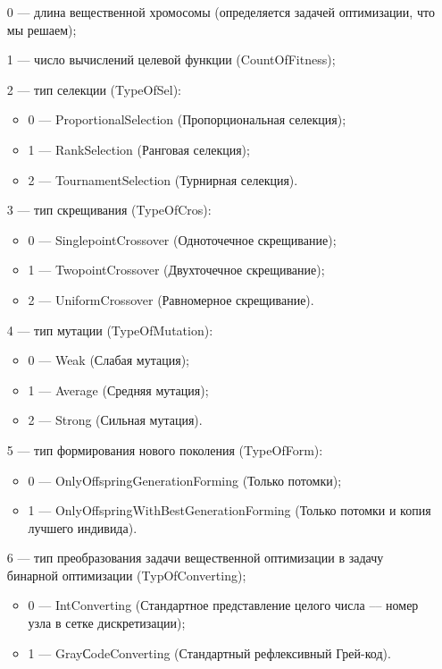  \begin{itemize}
 \item   [0] --- длина вещественной хромосомы (определяется задачей оптимизации, что мы решаем);
  \item   [1] --- число вычислений целевой функции (CountOfFitness);
  \item    [2] --- тип селекции (TypeOfSel):
 \begin{itemize}
       \item 0 --- ProportionalSelection (Пропорциональная селекция);
 
       \item 1 --- RankSelection (Ранговая селекция);
 
       \item 2 --- TournamentSelection (Турнирная селекция).
	    \end{itemize}
 
 \item [3] --- тип скрещивания (TypeOfCros):
  \begin{itemize}
       \item 0 --- SinglepointCrossover (Одноточечное скрещивание);
 
       \item 1 --- TwopointCrossover (Двухточечное скрещивание);
 
       \item 2 --- UniformCrossover (Равномерное скрещивание).
	    \end{itemize}
 
 \item [4] --- тип мутации (TypeOfMutation):
  \begin{itemize}
       \item 0 --- Weak (Слабая мутация);
 
       \item 1 --- Average (Средняя мутация);
 
       \item 2 --- Strong (Сильная мутация).
	    \end{itemize}
 
 \item [5] --- тип формирования нового поколения (TypeOfForm):
  \begin{itemize}
       \item 0 --- OnlyOffspringGenerationForming (Только потомки);
 
       \item 1 --- OnlyOffspringWithBestGenerationForming (Только потомки и копия лучшего индивида).
	    \end{itemize}
 \item [6] --- тип преобразования задачи вещественной оптимизации в задачу бинарной оптимизации (TypOfConverting);
   \begin{itemize}
        \item 0 --- IntConverting (Стандартное представление целого числа –-- номер узла в сетке дискретизации);
        \item 1 --- GrayСodeConverting (Стандартный рефлексивный Грей-код).
			    \end{itemize}
 \end{itemize}
 

